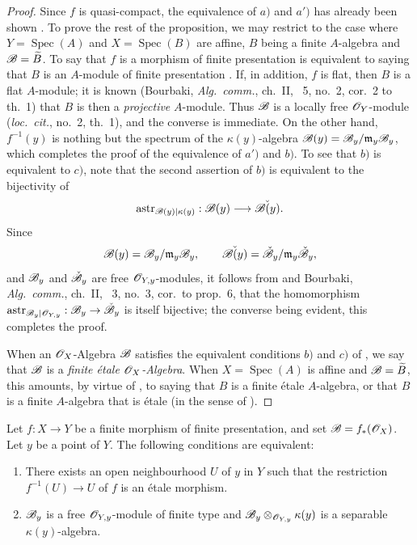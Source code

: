 \begin{proof}
Since $f$ is quasi-compact, the equivalence of $a)$ and $a')$ has already been shown .
To prove the rest of the proposition, we may restrict to the case where $Y=\operatorname{Spec}(A)$ and $X=\operatorname{Spec}(B)$ are affine, $B$ being a finite $A$-algebra and $\mathscr{B}=\widetilde{B}$.
To say that $f$ is a morphism of finite presentation is equivalent to saying that $B$ is an $A$-module of finite presentation .
If, in addition, $f$ is flat, then $B$ is a flat $A$-module; it is known (Bourbaki, \emph{Alg.\ comm.}, ch.~II, \textsection~5, no.~2, cor.~2 to th.~1) that $B$ is then a \emph{projective} $A$-module.  Thus $\mathscr{B}$ is a locally free $\mathscr{O}_Y$-module (\emph{loc.\ cit.}, no.~2, th.~1), and the converse is immediate.
On the other hand, $f^{-1}(y)$ is nothing but the spectrum of the $\kappa(y)$-algebra $\mathscr{B}(y)=\mathscr{B}_y/\mathfrak{m}_y\mathscr{B}_y$, which completes the proof of the equivalence of $a')$ and $b)$.
To see that $b)$ is equivalent to $c)$, note that the second assertion of $b)$ is equivalent to the bijectivity of
\[
 \operatorname{astr}_{\mathscr{B}(y)|\kappa(y)}:\mathscr{B}(y)\longrightarrow\check{\mathscr{B}(y)}.
\]
Since
\[
 \mathscr{B}(y)=\mathscr{B}_y/\mathfrak{m}_y\mathscr{B}_y,
 \qquad
 \check{\mathscr{B}(y)}=\check{\mathscr{B}}_y/\mathfrak{m}_y\check{\mathscr{B}}_y,
\]
and $\mathscr{B}_y$ and $\check{\mathscr{B}}_y$ are free $\mathscr{O}_{Y,y}$-modules, it follows from  and Bourbaki, \emph{Alg.\ comm.}, ch.~II, \textsection~3, no.~3, cor.\ to prop.~6, that the homomorphism $\operatorname{astr}_{\mathscr{B}_y|\mathscr{O}_{Y,y}}:\mathscr{B}_y\to\check{\mathscr{B}}_y$ is itself bijective;
the converse being evident, this completes the proof.

When an $\mathscr{O}_X$-Algebra $\mathscr{B}$ satisfies the equivalent conditions $b)$ and $c)$ of , we say that $\mathscr{B}$ is a \emph{finite \'etale $\mathscr{O}_X$-Algebra}.
When $X=\operatorname{Spec}(A)$ is affine and $\mathscr{B}=\widetilde{B}$, this amounts, by virtue of , to saying that $B$ is a finite \'etale $A$-algebra, or that $B$ is a finite $A$-algebra that is \'etale (in the sense of ).
\end{proof}

\begin{corollary}[18.2.4]
\label{IV.18.2.4}
Let $f:X\to Y$ be a finite morphism of finite presentation, and set $\mathscr{B}=f_*(\mathscr{O}_X)$.
Let $y$ be a point of $Y$.
The following conditions are equivalent:
\begin{enumerate}[label=\emph{\alph*)}]
  \item There exists an open neighbourhood $U$ of $y$ in $Y$ such that the restriction $f^{-1}(U)\to U$ of $f$ is an \'etale morphism.
  \item $\mathscr{B}_y$ is a free $\mathscr{O}_{Y,y}$-module of finite type and $\mathscr{B}_y\otimes_{\mathscr{O}_{Y,y}}\kappa(y)$ is a separable $\kappa(y)$-algebra.
\end{enumerate}
\end{corollary}

